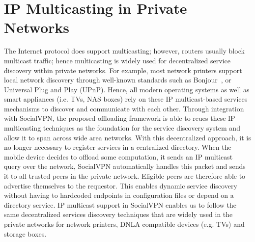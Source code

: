 \section{IP Multicasting in Private Networks}
\label{back:ipmulticast}
The Internet protocol does support multicasting; however, routers
usually block multicast traffic; hence multicasting is widely used for
decentralized service discovery within private networks.
%
For example, most network printers support local network discovery
through well-known standards such as Bonjour~\cite{bonjour}, or
Universal Plug and Play (UPnP).
%
Hence, all modern operating systems as well as smart appliances (i.e.
TVs, NAS boxes) rely on these IP multicast-based services mechanisms to
discover and communicate with each other.
%
Through integration with SocialVPN, the proposed offloading framework is
able to reues these IP multicasting techniques as the foundation for the
service discovery system and allow it to span across wide area networks.
%
With this decentralized approach, it is no longer necessary to register
services in a centralized directory.
%
When the mobile device decides to offload some computation, it sends an
IP multicast query over the network, SocialVPN automatically handles
this packet and sends it to all trusted peers in the private network.
%
Eligible peers are therefore able to advertise themselves to the
requestor.
%
This enables dynamic service discovery without having to hardcoded
endpoints in configuration files or depend on a directory service.
%
IP multicast support in SocialVPN enables us to follow the same
decentralized services discovery techniques that are widely used in the
private networks for network printers, DNLA compatible devices (e.g. TVs)
and storage boxes.
%


